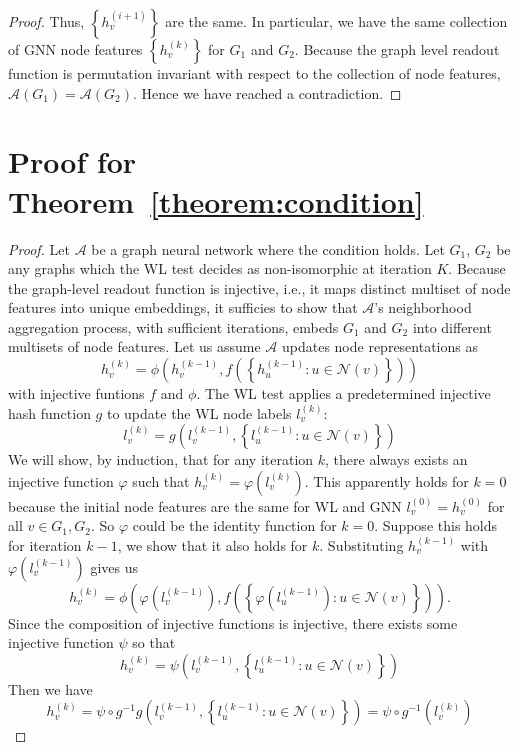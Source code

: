 \begin{appendix}
\begin{proof}
Thus, $\left\lbrace h_v^{(i+1)} \right\rbrace$ are the same. In particular, we have the same collection of GNN node features $\left\lbrace h_v^{(k)} \right\rbrace$ for $G_1$ and $G_2$. Because the graph level readout function is permutation invariant with respect to the collection of node features, $\mathcal{A}(G_1) = \mathcal{A}(G_2)$. Hence we have reached a contradiction.
\end{proof}

\section{Proof for Theorem~\ref{theorem:condition}}
\begin{proof}
Let $\mathcal{A}$ be a graph neural network where the condition holds. Let $G_1$, $G_2$ be any graphs which the WL test decides as non-isomorphic at iteration $K$. Because the graph-level readout function is injective, i.e., it maps distinct multiset of node features into unique embeddings, it sufficies to show that $\mathcal{A}$'s neighborhood aggregation process, with sufficient iterations, embeds $G_1$ and $G_2$ into different multisets of node features. Let us assume $\mathcal{A}$ updates node representations as
 \[h_v^{(k)} = \phi \left( h_v^{(k-1)}, f \left( \left\lbrace h_u^{(k-1)}: u\in \mathcal{N}(v)  \right\rbrace \right) \right) \]
with injective funtions  $f$ and $\phi$. The WL test applies a predetermined injective hash function $g$ to update the WL node labels $l_v^{(k)}$:
\[ l_v^{(k)} = g \left( l_v^{(k-1)}, \left\lbrace l_u^{(k-1)}: u \in \mathcal{N}(v)  \right\rbrace  \right) \]
We will show, by induction, that for any iteration $k$, there always exists an injective function $\varphi$ such that $h_v^{(k)} = \varphi \left( l_v^{(k)} \right)$. This apparently holds for $k = 0$ because the initial node features are the same for WL and GNN $l_v^{(0)} = h_v^{(0)}$ for all $v \in G_1, G_2$. So $\varphi$ could be the identity function for $k = 0$. Suppose this holds for iteration $k - 1$, we show that it also holds for $k$. Substituting $h_v^{(k-1)}$ with $\varphi \left( l_v^{(k-1)} \right)$ gives us
\[  h_v^{(k)} = \phi \left( \varphi \left( l_v^{(k-1)} \right), f \left( \left\lbrace \varphi \left( l_u^{(k-1)} \right): u\in \mathcal{N}(v)  \right\rbrace \right) \right).  \] 
Since the composition of injective functions is injective, there exists some injective function $\psi$ so that 
\[ h_v^{(k)} = \psi \left( l_v^{(k-1)}, \left\lbrace l_u^{(k-1)}: u \in \mathcal{N}(v)  \right\rbrace  \right) \]
Then we have 
\[ h_v^{(k)} = \psi \circ g^{-1} g \left( l_v^{(k-1)}, \left\lbrace l_u^{(k-1)}: u \in \mathcal{N}(v)  \right\rbrace  \right) =  \psi \circ g^{-1}  \left( l_v^{(k)} \right) \]

\end{proof}
\end{appendix}
